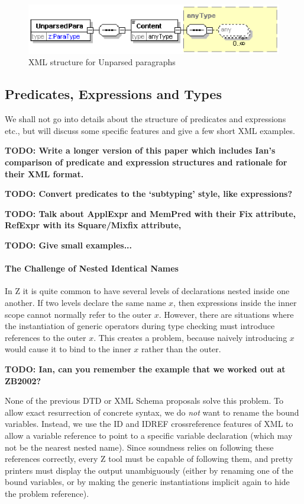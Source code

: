 \documentclass{llncs}  %
\newcommand{\TODO}[1]{\textbf{TODO: #1}}   %
\begin{document}
\begin{figure}[htbp]
  \centering
  \includegraphics[width=\textwidth]{unparsedpara.eps}
  \caption{XML structure for Unparsed paragraphs}
  \label{fig:unparsed}
\end{figure}


\subsection{Predicates, Expressions and Types}

We shall not go into details about the structure of predicates and
expressions etc., but will discuss some specific features and give
a few short XML examples.

\TODO{Write a longer version of this paper which includes Ian's
  comparison of predicate and expression structures and rationale
  for their XML format.}

\TODO{Convert predicates to the `subtyping' style, like expressions?}

\TODO{Talk about ApplExpr and MemPred with their Fix attribute, RefExpr
  with its Square/Mixfix attribute, }

\TODO{Give small examples...}


\paragraph{The Challenge of Nested Identical Names}

In Z it is quite common to have several levels of declarations nested 
inside one another.  If two levels declare the same name $x$, then
expressions inside the inner scope cannot normally refer to the outer $x$.
However, there are situations where the instantiation of generic
operators during type checking must introduce references to the outer $x$.
This creates a problem, because naively introducing $x$ would cause it
to bind to the inner $x$ rather than the outer.

\TODO{Ian, can you remember the example that we worked out at ZB2002?}

None of the previous DTD or XML Schema proposals solve this problem.
To allow exact resurrection of concrete syntax, we do \emph{not} want to
rename the bound variables.  Instead, we use the ID and IDREF
crossreference features of XML to allow a variable reference to point to
a specific variable declaration (which may not be the nearest nested
name).  Since soundness relies on following these references correctly,
every Z tool must be capable of following them, and pretty printers must
display the output unambiguously (either by renaming one of the bound
variables, or by making the generic instantiations implicit again to hide
the problem reference).  
\end{document}
